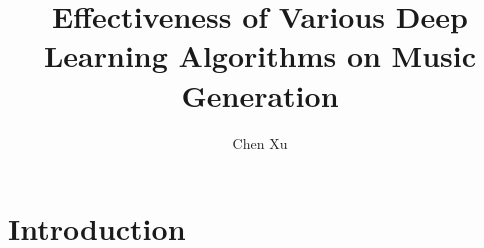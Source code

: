 \documentclass{article}
\begin{document}
\author{Chen Xu}
\title{Effectiveness of Various Deep Learning Algorithms on Music Generation}
\maketitle

\section{Introduction}
\end{document}
